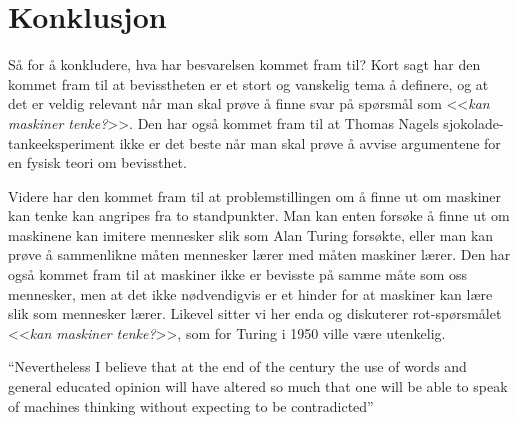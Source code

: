 \section{Konklusjon}

Så for å konkludere, hva har besvarelsen kommet fram til? 
Kort sagt har den kommet fram til at bevisstheten er et stort og vanskelig tema å definere, og at det er veldig relevant når man skal prøve å finne svar på spørsmål som <<\textit{kan maskiner tenke?}>>. 
Den har også kommet fram til at Thomas Nagels sjokolade-tankeeksperiment ikke er det beste når man skal prøve å avvise argumentene for en fysisk teori om bevissthet.

Videre har den kommet fram til at problemstillingen om å finne ut om maskiner kan tenke kan angripes fra to standpunkter. Man kan enten forsøke å finne ut om maskinene kan imitere mennesker slik som Alan Turing forsøkte, eller man kan prøve å sammenlikne måten mennesker lærer med måten maskiner lærer. 
Den har også kommet fram til at maskiner ikke er bevisste på samme måte som oss mennesker, men at det ikke nødvendigvis er et hinder for at maskiner kan lære slik som mennesker lærer.
Likevel sitter vi her enda og diskuterer rot-spørsmålet <<\textit{kan maskiner tenke?}>>, som for Turing i 1950 ville være utenkelig. 
\vspace{-1em}
\begin{pquotation}{\cite[442]{Turing1950}}
    ``Nevertheless I believe that at the
    end of the century the use of words and general educated opinion will have
    altered so much that one will be able to speak of machines thinking without
    expecting to be contradicted''
\end{pquotation}
